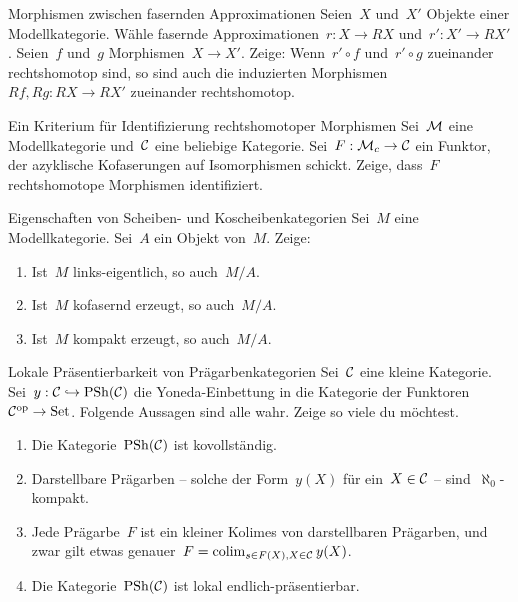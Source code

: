 \documentclass{uebblatt}
\begin{document}

\begin{aufgabe}{Morphismen zwischen fasernden Approximationen}
Seien~$X$ und~$X'$ Objekte einer Modellkategorie. Wähle fasernde
Approximationen~$r : X \to RX$ und~$r' : X' \to RX'$. Seien~$f$ und~$g$
Morphismen~$X \to X'$. Zeige: Wenn~$r' \circ f$ und~$r' \circ g$ zueinander
rechtshomotop sind, so sind auch die induzierten Morphismen~$Rf, Rg : RX \to
RX'$ zueinander rechtshomotop.
\end{aufgabe}

\begin{aufgabe}{Ein Kriterium für Identifizierung rechtshomotoper Morphismen}
Sei~$\mathcal{M}$ eine Modellkategorie und~$\mathcal{C}$ eine beliebige Kategorie. Sei~$F : \mathcal{M}_c
\to \mathcal{C}$ ein Funktor, der azyklische Kofaserungen auf Isomorphismen schickt.
Zeige, dass~$F$ rechtshomotope Morphismen identifiziert.
\end{aufgabe}

\begin{aufgabe}{Eigenschaften von Scheiben- und Koscheibenkategorien}
Sei~$M$ eine Modellkategorie. Sei~$A$ ein Objekt von~$M$. Zeige:
\begin{enumerate}
\item Ist~$M$ links-eigentlich, so auch~$M/A$.
\item Ist~$M$ kofasernd erzeugt, so auch~$M/A$.
\item Ist~$M$ kompakt erzeugt, so auch~$M/A$.
\end{enumerate}
\end{aufgabe}

\begin{aufgabe}{Lokale Präsentierbarkeit von Prägarbenkategorien}
Sei~$\mathcal{C}$ eine kleine Kategorie. Sei~$y : \mathcal{C} \hookrightarrow \mathrm{PSh}(\mathcal{C})$ die
Yoneda-Einbettung in die Kategorie der Funktoren~$\mathcal{C}^{\mathrm{op}} \to \mathrm{Set}$.
Folgende Aussagen sind alle wahr. Zeige so viele
du möchtest.
\begin{enumerate}
\item Die Kategorie~$\mathrm{PSh}(\mathcal{C})$ ist kovollständig.
\item Darstellbare Prägarben -- solche der Form~$y(X)$ für ein~$X \in \mathcal{C}$ --
sind~$\aleph_0$-kompakt.
\item Jede Prägarbe~$F$ ist ein kleiner Kolimes von darstellbaren Prägarben,
und zwar gilt etwas genauer~$F = \operatorname*{colim}_{s \in F(X), X \in \mathcal{C}} y(X)$.
\item Die Kategorie~$\mathrm{PSh}(\mathcal{C})$ ist lokal endlich-präsentierbar.
\end{enumerate}
\end{aufgabe}
\end{document}
